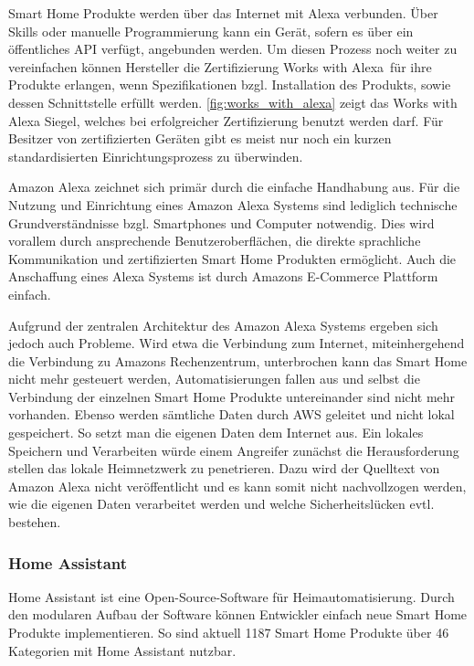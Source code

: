 Smart Home Produkte werden über das Internet mit Alexa verbunden.
Über Skills oder manuelle Programmierung kann ein Gerät, sofern es über ein öffentliches \ac{API} verfügt, angebunden werden.
Um diesen Prozess noch weiter zu vereinfachen können Hersteller die Zertifizierung \glqq Works with Alexa\grqq \ für ihre Produkte erlangen, wenn Spezifikationen bzgl. Installation des Produkts, sowie dessen Schnittstelle erfüllt werden.
\autoref{fig:works_with_alexa} zeigt das Works with Alexa Siegel, welches bei erfolgreicher Zertifizierung benutzt werden darf.
Für Besitzer von zertifizierten Geräten gibt es meist nur noch ein kurzen standardisierten Einrichtungsprozess zu überwinden.

Amazon Alexa zeichnet sich primär durch die einfache Handhabung aus.
Für die Nutzung und Einrichtung eines Amazon Alexa Systems sind lediglich technische Grundverständnisse bzgl. Smartphones und Computer notwendig.
Dies wird vorallem durch ansprechende Benutzeroberflächen, die direkte sprachliche Kommunikation und zertifizierten Smart Home Produkten ermöglicht.
Auch die Anschaffung eines Alexa Systems ist durch Amazons E-Commerce Plattform einfach.

Aufgrund der zentralen Architektur des Amazon Alexa Systems ergeben sich jedoch auch Probleme.
Wird etwa die Verbindung zum Internet, miteinhergehend die Verbindung zu Amazons Rechenzentrum, unterbrochen kann das Smart Home nicht mehr gesteuert werden, Automatisierungen fallen aus und selbst die Verbindung der einzelnen Smart Home Produkte untereinander sind nicht mehr vorhanden.
Ebenso werden sämtliche Daten durch \ac{AWS} geleitet und nicht lokal gespeichert.
So setzt man die eigenen Daten dem Internet aus.
Ein lokales Speichern und Verarbeiten würde einem Angreifer zunächst die Herausforderung stellen das lokale Heimnetzwerk zu penetrieren.
Dazu wird der Quelltext von Amazon Alexa nicht veröffentlicht und es kann somit nicht nachvollzogen werden, wie die eigenen Daten verarbeitet werden und welche Sicherheitslücken evtl. bestehen.

\subsubsection{Home Assistant}

Home Assistant ist eine Open-Source-Software für Heimautomatisierung.
Durch den modularen Aufbau der Software können Entwickler einfach neue Smart Home Produkte implementieren.
So sind aktuell 1187 Smart Home Produkte über 46 Kategorien mit Home Assistant nutzbar.

